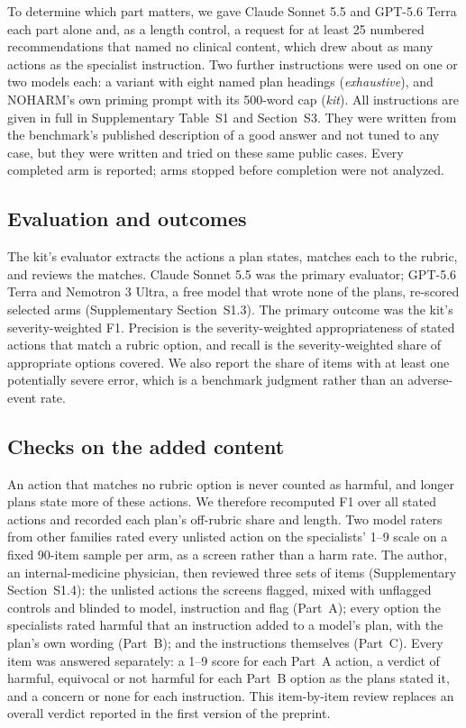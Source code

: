 \documentclass[11pt]{article}
\begin{document}
To determine which part matters, we gave Claude Sonnet 5.5 and GPT-5.6 Terra each part alone and,
as a length control, a request for at least 25 numbered recommendations that named no clinical
content, which drew about as many actions as the specialist instruction. Two further instructions
were used on one or two models each: a variant with eight named plan headings (\emph{exhaustive}),
and NOHARM's own priming prompt with its 500-word cap (\emph{kit}). All instructions are given in
full in Supplementary Table~S1 and Section~S3. They were
written from the benchmark's published description of a good answer and not tuned to any case, but
they were written and tried on these same public cases. Every completed arm is reported; arms
stopped before completion were not analyzed.

\subsection*{Evaluation and outcomes}
\label{sec:evaluation}
\label{sec:outcomes}
The kit's evaluator extracts the actions a plan states, matches each to the rubric, and reviews the
matches. Claude Sonnet 5.5 was the primary evaluator; GPT-5.6 Terra and Nemotron 3 Ultra, a free
model that wrote none of the plans, re-scored selected arms (Supplementary
Section~S1.3). The primary outcome was the kit's severity-weighted F1. Precision
is the severity-weighted appropriateness of stated actions that match a rubric option, and recall
is the severity-weighted share of appropriate options covered. We also report the share of items
with at least one potentially severe error, which is a benchmark judgment rather than an
adverse-event rate.

\subsection*{Checks on the added content}
\label{sec:safety-methods}
An action that matches no rubric option is never counted as harmful, and longer plans state more of
these actions. We therefore recomputed F1 over all stated actions and recorded each plan's
off-rubric share and length. Two model raters from other families rated every unlisted action on
the specialists' 1--9 scale on a fixed 90-item sample per arm, as a screen rather than a harm rate.
The author, an internal-medicine physician, then reviewed three sets of items (Supplementary
Section~S1.4): the unlisted actions the screens flagged, mixed with unflagged
controls and blinded to model, instruction and flag (Part~A); every option the specialists rated
harmful that an instruction added to a model's plan, with the plan's own wording (Part~B); and the
instructions themselves (Part~C). Every item was answered separately: a 1--9 score for each Part~A
action, a verdict of harmful, equivocal or not harmful for each Part~B option as the plans stated it,
and a concern or none for each instruction. This item-by-item review replaces an overall verdict
reported in the first version of the preprint.
\end{document}
